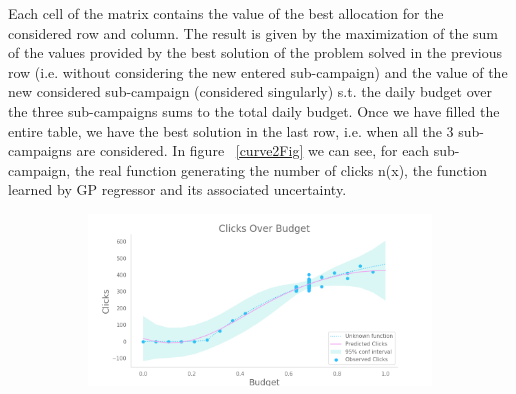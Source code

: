 Each cell of the matrix contains the value of the best allocation for the considered row and column.
The result is given by the maximization of the sum of the values provided by the best solution of the problem solved in the previous row (i.e. without considering the new entered sub-campaign) and 
the value of the new considered sub-campaign (considered singularly) s.t. the daily budget over the three sub-campaigns sums to the total daily budget.
Once we have filled the entire table, we have the best solution in the last row, i.e. when all the 3 sub-campaigns are considered.
In figure ~\ref{curve2Fig} we can see, for each sub-campaign, the real function generating the number of clicks n(x), the function learned by GP regressor and its associated uncertainty.

\begin{figure}[!htb]
	\centering
	
	\begin{subfigure}[!H]{0.8\textwidth}
		\centering
		\includegraphics[width=\textwidth]{images/part2_bidding_curve_subcamaign_0.png}
	\end{subfigure}
	

\end{figure}
